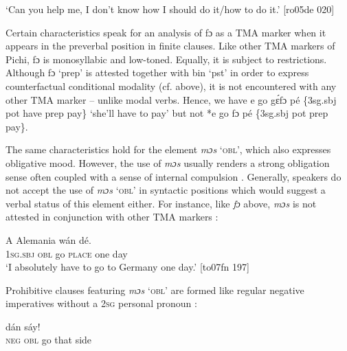 \glt ‘Can you help me, I don’t know how I should do it/how to do it.’ [ro05de 020]
\z

Certain characteristics speak for an analysis of fɔ as a TMA marker when it appears in the preverbal position in finite clauses. Like other TMA markers of Pichi, fɔ is monosyllabic and low-toned. Equally, it is subject to restrictions. Although fɔ ‘prep’ is attested together with bin ‘pst’ in order to express counterfactual conditional modality (cf.  above), it is not encountered with any other TMA marker – unlike modal verbs. Hence, we have e go gɛ́fɔ pé \{3sg.sbj pot have prep pay\} ‘she’ll have to pay’ but not *e go fɔ pé \{3sg.sbj pot prep pay\}. 


The same characteristics hold for the element \textit{mɔs} ‘\textsc{obl’}, which also expresses obligative mood. However, the use of \textit{mɔs} usually renders a strong obligation sense often coupled with a sense of internal compulsion . Generally, speakers do not accept the use of \textit{mɔs} ‘\textsc{obl}’ in syntactic positions which would suggest a verbal status of this element either. For instance, like \textit{fɔ} above, \textit{mɔs} is not attested in conjunction with other TMA markers : 



\ea%
    \label{ex:key:421}
    \gll \MakeUppercase{A}         Alemania  wán    dé.\\
\textsc{1sg.sbj}  \textsc{obl}    go  \textsc{place}    one    day\\

\glt ‘I absolutely have to go to Germany one day.’ [to07fn 197]
\z


\z

Prohibitive clauses featuring \textit{mɔs} ‘\textsc{obl}’ are formed like regular negative imperatives without a \textsc{2sg} personal pronoun :


\ea%
    \label{ex:key:423}
    \gll {}        dán    sáy!  \\
\textsc{neg}  \textsc{obl}    go  that    side  \\

